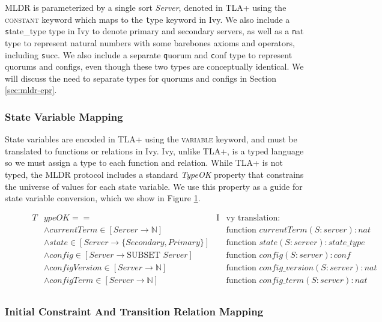 \documentclass[12pt]{article}
\newcommand{\tla}[1]{{\small\scshape #1}}
\newcommand{\ivy}[1]{{\footnotesize\texttt #1}}
\begin{document}
MLDR is parameterized by a single sort \textit{Server}, denoted in TLA+ using the \tla{constant} keyword which maps to the \ivy{type} keyword in Ivy.  We also include a \ivy{state\_type} type in Ivy to denote primary and secondary servers, as well as a \ivy{nat} type to represent natural numbers with some barebones axioms and operators, including \ivy{succ}.  We also include a separate \ivy{quorum} and \ivy{conf} type to represent quorums and configs, even though these two types are conceptually identical.  We will discuss the need to separate types for quorums and configs in Section \ref{sec:mldr-epr}.

\subsubsection{State Variable Mapping}

State variables are encoded in TLA+ using the \tla{variable} keyword, and must be translated to functions or relations in Ivy.  Ivy, unlike TLA+, is a typed language so we must assign a type to each function and relation.  While TLA+ is not typed, the MLDR protocol includes a standard \textit{TypeOK} property that constrains the universe of values for each state variable.  We use this property as a guide for state variable conversion, which we show in Figure \ref{fig:statevar-map}.

\begin{figure}
  \label{fig:statevar-map}
  \begin{align*}
    T&ypeOK ==& \text{I}&\text{vy translation:}\\
      &\land currentTerm \in [Server \to \mathbb{N}]& &\text{function } currentTerm(S:server) : nat\\
      &\land state \in [Server \to \{Secondary, Primary\}]& &\text{function } state(S:server) : state\_type\\
      &\land config \in [Server \to \text{SUBSET } Server]& &\text{function } config(S:server) : conf\\
      &\land configVersion \in [Server \to \mathbb{N}]& &\text{function } config\_version(S:server) : nat\\
      &\land configTerm \in [Server \to \mathbb{N}]& &\text{function } config\_term(S:server) : nat\\
  \end{align*}
\end{figure}

\subsubsection{Initial Constraint And Transition Relation Mapping}
\end{document}
